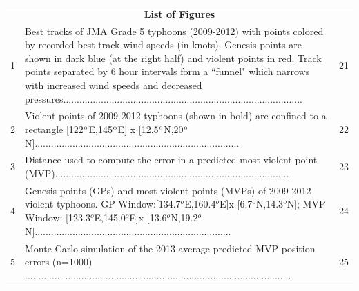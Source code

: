 \documentclass[a4paper, 12pt]{article}
\begin{document}
{\begin{table}
\begin{tabular}{lll}
\multicolumn{3}{c}{{\bf \large List of Figures}}\\
 \multicolumn{1}{m{.5in}}{1\vspace{2.45in}}&\multicolumn{1}{m{4.5in}}{Best tracks of JMA Grade 5 typhoons (2009-2012) with points colored by recorded best track wind speeds (in knots). Genesis points are shown in dark blue (at the right half) and violent points in red. Track points separated by 6 hour intervals form a ``funnel" which narrows with increased wind speeds and decreased pressures.........................................................................................}&\multicolumn{1}{m{.5in}}{\vspace{2.4in}21} \\
 \multicolumn{1}{m{.5in}}{2\vspace{.8in}}&\multicolumn{1}{m{4.5in}}{Violent points of  2009-2012 typhoons (shown in bold) are confined to a rectangle [122$^{\textup{o}}$E,145$^{\textup{o}}$E] x [12.5$^{\textup{o}}$N,20$^{\textup{o}}$N]............................................................................}&\multicolumn{1}{m{.5in}}{\vspace{.9in}22} \\
 \multicolumn{1}{m{.5in}}{3\vspace{.8in}}&\multicolumn{1}{m{4.5in}}{Distance used to compute the error in a predicted most violent point (MVP).......................................................................................}&\multicolumn{1}{m{.5in}}{\vspace{.75in}23} \\
 \multicolumn{1}{m{.5in}}{4\vspace{1.25in}}&\multicolumn{1}{m{4.5in}}{ Genesis points (GPs) and most violent points (MVPs) of 2009-2012 violent typhoons. GP Window:[134.7$^o$E,160.4$^o$E]x [6.7$^o$N,14.3$^o$N]; MVP Window: [123.3$^o$E,145.0$^o$E]x [13.6$^o$N,19.2$^o$N].........................................................................}&\multicolumn{1}{m{.4in}}{\vspace{1.25in}24} \\
 \multicolumn{1}{m{.5in}}{5\vspace{.8in}}&\multicolumn{1}{m{4.5in}}{ Monte Carlo simulation of the 2013 average predicted MVP position errors (n=1000) ...................................................................................................}&\multicolumn{1}{m{.4in}}{\vspace{.85in}25} \\
\end{tabular}
\end{table}

}
\end{document}
